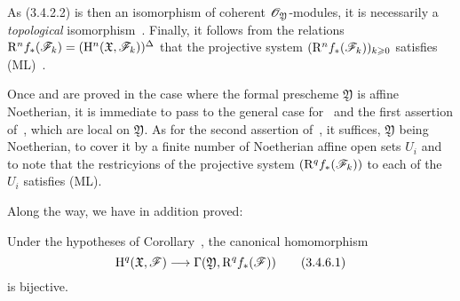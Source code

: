 \begin{env}[3.4.5]
As (3.4.2.2) is then an isomorphism of coherent $\mathscr{O}_\mathfrak{Y}$-modules, it is necessarily a \emph{topological} isomorphism~.
Finally, it follows from the relations $\mathrm{R}^n f_*(\mathscr{F}_k)=(\mathrm{H}^n(\mathfrak{X},\mathscr{F}_k))^\Delta$ that the projective system $(\mathrm{R}^n f_*(\mathscr{F}_k))_{k\geqslant 0}$ satisfies (ML)~.

Once  and  are proved in the case where the formal prescheme $\mathfrak{Y}$ is affine Noetherian, it is immediate to pass to the general case for~ and the first assertion of~, which are local on $\mathfrak{Y}$.
As for the second assertion of~, it suffices, $\mathfrak{Y}$ being Noetherian, to cover it by a finite number of Noetherian affine open sets $U_i$ and to note that the restricyions of the projective system $(\mathrm{R}^q f_*(\mathscr{F}_k))$ to each of the $U_i$ satisfies (ML).
\end{env}

Along the way, we have in addition proved:
\begin{corollary}[3.4.6]
\label{3.3.4.6}
Under the hypotheses of Corollary~, the canonical homomorphism
\[
\label{3.3.4.6.1}
  \HH^q(\mathfrak{X},\sh{F})\to\Gamma(\mathfrak{Y},\RR^q f_*(\sh{F}))
  \tag{3.4.6.1}
\]
is bijective.
\end{corollary}

